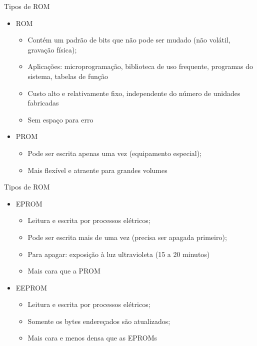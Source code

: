 \begin{slide}{Tipos de ROM}
\begin{itemize}
   \item ROM
   \begin{itemize}
      \item Contém um padrão de bits que não pode ser mudado (não volátil, gravação física);
      \item Aplicações: microprogramação, biblioteca de uso frequente, programas do sistema, tabelas de função
      \item Custo alto e relativamente fixo, independente do número de unidades fabricadas
      \item Sem espaço para erro
   \end{itemize}
   \item PROM 
   \begin{itemize}
      \item Pode ser escrita apenas uma vez (equipamento especial);
      \item Mais flexível e atraente para grandes volumes
   \end{itemize}

\end{itemize}

\end{slide}

\begin{slide}{Tipos de ROM}
\begin{itemize}
   \item EPROM
   \begin{itemize}
      \item Leitura e escrita por processos elétricos;
      \item Pode ser escrita mais de uma vez (precisa ser apagada primeiro);
      \item Para apagar: exposição à luz ultravioleta (15 a 20 minutos)
      \item Mais cara que a PROM
   \end{itemize}
   \item EEPROM 
   \begin{itemize}
      \item Leitura e escrita por processos elétricos;
      \item Somente os bytes endereçados são atualizados;
      \item Mais cara e menos densa que as EPROMs
   \end{itemize}
\end{itemize}
\end{slide}

